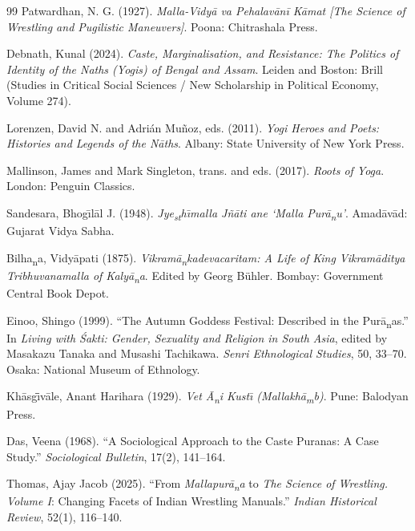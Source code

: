 \documentclass[11pt,twoside,letterpaper]{article}
\begin{document}
\begin{thebibliography}{99}
Patwardhan, N. G. (1927). \textit{Malla-Vidy\={a} va Pehalav\={a}n\={i} K\={a}mat [The Science of Wrestling and Pugilistic Maneuvers]}. Poona: Chitrashala Press.

Debnath, Kunal (2024). \textit{Caste, Marginalisation, and Resistance: The Politics of Identity of the Naths (Yogis) of Bengal and Assam}. Leiden and Boston: Brill (Studies in Critical Social Sciences / New Scholarship in Political Economy, Volume 274).

Lorenzen, David N. and Adrián Muñoz, eds. (2011). \textit{Yogi Heroes and Poets: Histories and Legends of the Nāths}. Albany: State University of New York Press.

Mallinson, James and Mark Singleton, trans. and eds. (2017). \textit{Roots of Yoga}. London: Penguin Classics.

Sandesara, Bhog\={\i}l\={a}l J. (1948). \textit{Jye\textsubscript{s}\textsubscript{t}h\={\i}malla J\~n\={a}ti ane `Malla Pur\={a}\textsubscript{n}u'}. Amad\={a}v\={a}d: Gujarat Vidya Sabha.

Bilha\textsubscript{n}a, Vidy\={a}pati (1875). \textit{Vikram\={a}\textsubscript{n}kadevacaritam: A Life of King Vikram\={a}ditya Tribhuvanamalla of Kaly\={a}\textsubscript{n}a}. Edited by Georg B\"{u}hler. Bombay: Government Central Book Depot.

Einoo, Shingo (1999). ``The Autumn Goddess Festival: Described in the Pur\={a}\textsubscript{n}as.'' In \textit{Living with \'Sakti: Gender, Sexuality and Religion in South Asia}, edited by Masakazu Tanaka and Musashi Tachikawa. \textit{Senri Ethnological Studies}, 50, 33--70. Osaka: National Museum of Ethnology.

Kh\={a}sg\={\={\i}}v\={a}le, Anant Harihara (1929). \textit{Vet \={A}\textsubscript{n}i Kust\={\i} (Mallakh\={a}\textsubscript{m}b)}. Pune: Balodyan Press.

Das, Veena (1968). ``A Sociological Approach to the Caste Puranas: A Case Study.'' \textit{Sociological Bulletin}, 17(2), 141--164.

Thomas, Ajay Jacob (2025). ``From \textit{Mallapur\={a}\textsubscript{n}a} to \textit{The Science of Wrestling. Volume I}: Changing Facets of Indian Wrestling Manuals.'' \textit{Indian Historical Review}, 52(1), 116--140.


\end{thebibliography}
\end{document}
